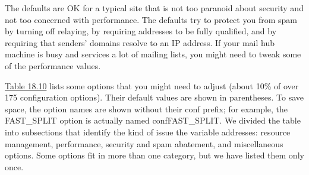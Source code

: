 The defaults are OK for a typical site that is not too paranoid about
security and not too concerned with performance. The defaults try to
protect you from spam by turning off relaying, by requiring addresses to
be fully qualified, and by requiring that senders' domains resolve to an
IP address. If your mail hub machine is busy and services a lot of
mailing lists, you might need to tweak some of the performance values.

\protect\hyperlink{part0026_split_036.htmlux5cux23_idTextAnchor1087}{Table
18.10} lists some options that you might need to adjust (about 10\% of
over 175 configuration options). Their default values are shown in
parentheses. To save space, the option names are shown without their
{conf} prefix; for example, the {FAST\_SPLIT} option is actually named
{confFAST\_SPLIT}. We divided the table into subsections that identify
the kind of issue the variable addresses: resource management,
performance, security and spam abatement, and miscellaneous options.
Some options fit in more than one category, but we have listed them only
once.

